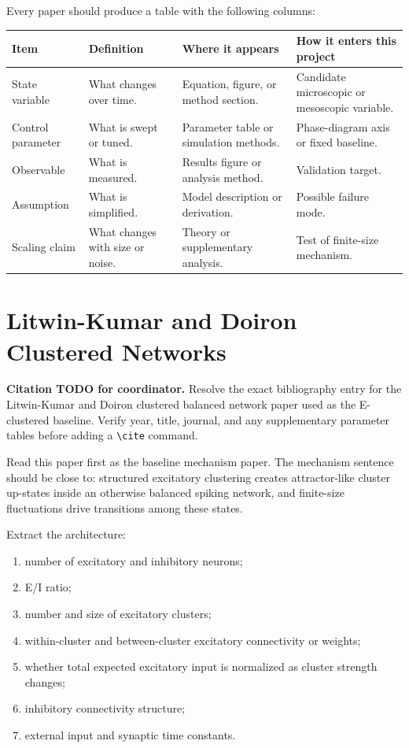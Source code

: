 Every paper should produce a table with the following columns:
%
\begin{longtable}{@{}p{}p{}p{}p{}@{}}
\toprule
\textbf{Item} & \textbf{Definition} & \textbf{Where it appears} & \textbf{How it enters this project} \\
\midrule
State variable & What changes over time. & Equation, figure, or method section. & Candidate microscopic or mesoscopic variable. \\
Control parameter & What is swept or tuned. & Parameter table or simulation methods. & Phase-diagram axis or fixed baseline. \\
Observable & What is measured. & Results figure or analysis method. & Validation target. \\
Assumption & What is simplified. & Model description or derivation. & Possible failure mode. \\
Scaling claim & What changes with size or noise. & Theory or supplementary analysis. & Test of finite-size mechanism. \\
\bottomrule
\end{longtable}

\section{Litwin-Kumar and Doiron Clustered Networks}
\label{app:reading-litwin-kumar-doiron}

\textbf{Citation TODO for coordinator.} Resolve the exact bibliography entry for the Litwin-Kumar and Doiron clustered balanced network paper used as the E-clustered baseline. Verify year, title, journal, and any supplementary parameter tables before adding a \texttt{\textbackslash cite} command.

Read this paper first as the baseline mechanism paper. The mechanism sentence should be close to: structured excitatory clustering creates attractor-like cluster up-states inside an otherwise balanced spiking network, and finite-size fluctuations drive transitions among these states.

Extract the architecture:
%
\begin{enumerate}[leftmargin=*]
  \item number of excitatory and inhibitory neurons;
  \item E/I ratio;
  \item number and size of excitatory clusters;
  \item within-cluster and between-cluster excitatory connectivity or weights;
  \item whether total expected excitatory input is normalized as cluster strength changes;
  \item inhibitory connectivity structure;
  \item external input and synaptic time constants.
\end{enumerate}

